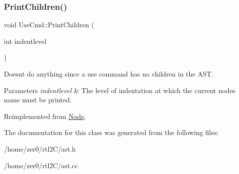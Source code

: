 \subsubsection{\texorpdfstring{Print\+Children()}{PrintChildren()}}
{\footnotesize\ttfamily void Use\+Cmd\+::\+Print\+Children (\begin{DoxyParamCaption}\item[{int}]{indentlevel }\end{DoxyParamCaption})\hspace{0.3cm}{\ttfamily [virtual]}}

Doesn\textquotesingle{}t do anything since a use command has no children in the A\+ST. 
\begin{DoxyParams}{Parameters}
{\em indentlevel} & The level of indentation at which the current node\textquotesingle{}s name must be printed. \\
\hline
\end{DoxyParams}


Reimplemented from \hyperlink{class_node_a3e67ec8d22182b721717af14fe0c3000}{Node}.



The documentation for this class was generated from the following files\+:\begin{DoxyCompactItemize}
\item 
/home/zer0/rtl2\+C/ast.\+h\item 
/home/zer0/rtl2\+C/ast.\+cc\end{DoxyCompactItemize}
